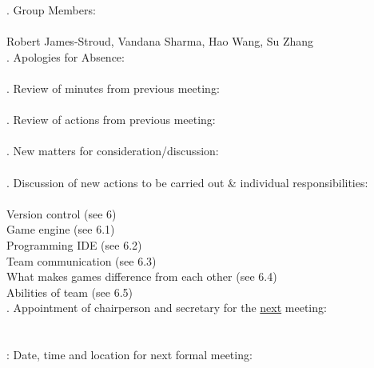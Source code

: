 \documentclass{article}
\begin{document}
. Group Members: \\\\ \indent Robert James-Stroud, Vandana Sharma, Hao Wang, Su Zhang \\

. Apologies for Absence: \\ \indent   \\

. Review of minutes from previous meeting: \\ \indent  \\

. Review of actions from previous meeting: \\ \indent \\

. New matters for consideration/discussion: \\ \indent  \\

. Discussion of new actions to be carried out \& individual responsibilities: \\\\ \indent  Version control (see 6) \\ \indent Game engine (see 6.1) \\ \indent Programming IDE (see 6.2) \\ \indent Team communication (see 6.3)\\ \indent What makes games difference from each other (see 6.4) \\ \indent Abilities of team (see 6.5) \\ 

. Appointment of chairperson and secretary for the \underline{next} meeting: \\\\ \indent  \\

: Date, time and location for next formal meeting: \\\\ \indent  \\
\end{document}
